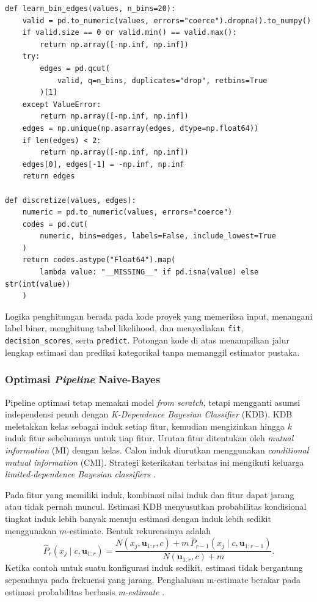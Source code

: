 \begin{lstlisting}[caption={Diskretisasi kuantil yang hanya mempelajari batas dari data fit},label={lst-nb-discretization}]
def learn_bin_edges(values, n_bins=20):
    valid = pd.to_numeric(values, errors="coerce").dropna().to_numpy()
    if valid.size == 0 or valid.min() == valid.max():
        return np.array([-np.inf, np.inf])
    try:
        edges = pd.qcut(
            valid, q=n_bins, duplicates="drop", retbins=True
        )[1]
    except ValueError:
        return np.array([-np.inf, np.inf])
    edges = np.unique(np.asarray(edges, dtype=np.float64))
    if len(edges) < 2:
        return np.array([-np.inf, np.inf])
    edges[0], edges[-1] = -np.inf, np.inf
    return edges

def discretize(values, edges):
    numeric = pd.to_numeric(values, errors="coerce")
    codes = pd.cut(
        numeric, bins=edges, labels=False, include_lowest=True
    )
    return codes.astype("Float64").map(
        lambda value: "__MISSING__" if pd.isna(value) else str(int(value))
    )
\end{lstlisting}

Logika penghitungan berada pada kode proyek yang memeriksa
input, menangani label biner, menghitung tabel likelihood, dan menyediakan
\texttt{fit}, \texttt{decision\_scores}, serta \texttt{predict}. Potongan
kode di atas menampilkan jalur lengkap estimasi dan prediksi kategorikal
tanpa memanggil estimator pustaka.

\subsubsection{Optimasi \textit{Pipeline} Naive-Bayes}
\label{sec:implementasi-nb-optimasi}

Pipeline optimasi tetap memakai model \textit{from scratch}, tetapi
mengganti asumsi independensi penuh dengan
\textit{K-Dependence Bayesian Classifier} (KDB). KDB meletakkan kelas sebagai
induk setiap fitur, kemudian mengizinkan hingga $k$ induk fitur sebelumnya
untuk tiap fitur. Urutan fitur ditentukan oleh \textit{mutual information}
(MI) dengan kelas. Calon induk diurutkan menggunakan
\textit{conditional mutual information} (CMI). Strategi keterikatan terbatas
ini mengikuti keluarga \textit{limited-dependence Bayesian classifiers}
\cite{sahami1996limited,friedman1997bayesian}.

Pada fitur yang memiliki induk, kombinasi nilai induk dan fitur dapat jarang
atau tidak pernah muncul. Estimasi KDB menyusutkan
probabilitas kondisional tingkat induk lebih banyak menuju estimasi dengan
induk lebih sedikit menggunakan $m$-estimate. Bentuk rekurensinya adalah
\[
    \widehat{P}_{r}(x_j\mid c,\boldsymbol{u}_{1:r}) =
    \frac{N(x_j,\boldsymbol{u}_{1:r},c)
        +m\,\widehat{P}_{r-1}(x_j\mid c,\boldsymbol{u}_{1:r-1})}
    {N(\boldsymbol{u}_{1:r},c)+m}.
\]
Ketika contoh untuk suatu konfigurasi induk sedikit, estimasi tidak
bergantung sepenuhnya pada frekuensi yang jarang.
Penghalusan m-estimate berakar pada estimasi probabilitas berbasis
\textit{m-estimate} \cite{cestnik1990estimating}.

